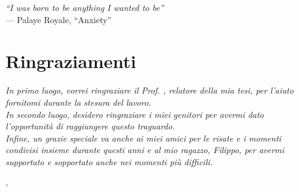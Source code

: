 \cleardoublepage
{}
{}

\begin{flushright}{
    \slshape
    ``I was born to be anything I wanted to be''} \\
    \medskip
    --- Palaye Royale, ``Anxiety''
\end{flushright}


\bigskip

\begingroup
\let\clearpage\relax
\let\cleardoublepage\relax
\let\cleardoublepage\relax

\chapter*{Ringraziamenti}

\noindent \textit{In primo luogo, vorrei ringraziare il Prof. \myProf, relatore della mia tesi, per l'aiuto fornitomi durante la stesura del lavoro.}\\

\noindent \textit{In secondo luogo, desidero ringraziare i miei genitori per avermi dato l'opportunità di raggiungere questo traguardo.}\\

\noindent \textit{Infine, un grazie speciale va anche ai miei amici per le risate e i momenti condivisi insieme durante questi anni e al mio ragazzo, Filippo, per avermi supportato e sopportato anche nei momenti più difficili.}\\

\bigskip

\noindent\textit{\myLocation, \myTime}
\hfill \myName

\endgroup
